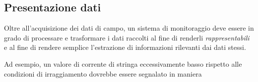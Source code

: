 \subsection{Presentazione dati}
Oltre all'acquisizione dei dati di campo, un sistema di monitoraggio deve essere in grado
di processare e trasformare i dati raccolti al fine di renderli \emph{rappresentabili}
e al fine di rendere semplice l'estrazione di informazioni rilevanti dai dati stessi.
%

%
Ad esempio, un valore di corrente di stringa eccessivamente basso rispetto alle condizioni
di irraggiamento dovrebbe essere segnalato in maniera 





